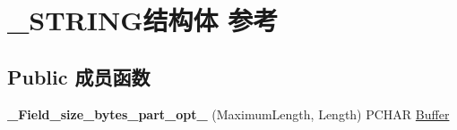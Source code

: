 \hypertarget{struct___s_t_r_i_n_g}{}\section{\+\_\+\+S\+T\+R\+I\+N\+G结构体 参考}
\label{struct___s_t_r_i_n_g}
\subsection*{Public 成员函数}
\begin{DoxyCompactItemize}
\item 
\mbox{\label{struct___s_t_r_i_n_g_afcea56ad480c845bae0eb414495aa1d8}} 
{\bfseries \+\_\+\+Field\+\_\+size\+\_\+bytes\+\_\+part\+\_\+opt\+\_\+} (Maximum\+Length, Length) P\+C\+H\+AR \hyperlink{class_buffer}{Buffer}
\end{DoxyCompactItemize}
